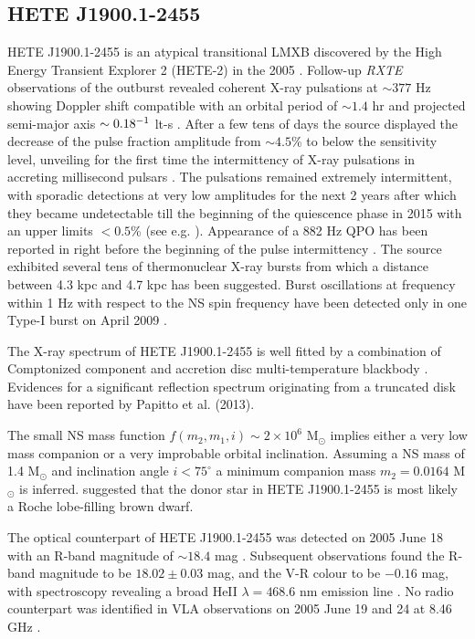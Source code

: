 \documentclass[graybox]{svmult}
\def \rxte {{\em RXTE\xspace}}
\begin{document}
\subsection{HETE J1900.1-2455}

HETE J1900.1-2455 is an atypical transitional LMXB discovered by the High Energy Transient Explorer 2 (HETE-2) in the 2005 \cite{Vanderspek2005}. Follow-up \rxte{} observations of the outburst revealed coherent X-ray pulsations at $\sim377$ Hz showing Doppler shift compatible with an orbital period of $\sim1.4$ hr and projected semi-major axis $\sim0.18\time10^{-1}$ lt-s \cite{Kaaret2006}. After a few tens of days the source displayed the decrease of the pulse fraction amplitude from $\sim4.5$\% to below the sensitivity level, unveiling for the first time the intermittency of X-ray pulsations in accreting millisecond pulsars \cite{Galloway2005b}. The pulsations remained extremely intermittent, with sporadic detections at very low amplitudes for the next 2 years \cite{Patruno2012a} after which they became undetectable till the beginning of the quiescence phase in 2015 \cite{Degenaar2017} with an upper limits $<0.5$\% (see e.g. \cite{Galloway2008,Patruno2012a,Papitto2013a}). Appearance of a 882 Hz QPO has been reported in right before the beginning of the pulse intermittency \cite{Kaaret2006}.
The source exhibited several tens of thermonuclear X-ray bursts from which a distance between 4.3 kpc \cite{Suzuki2007} and 4.7 kpc \cite{Galloway2008} has been suggested. Burst oscillations at frequency within 1 Hz with respect to the NS spin frequency have been detected only in one Type-I burst on April 2009 \cite{Watts2009}. 

The X-ray spectrum of HETE J1900.1-2455 is well fitted by a combination of Comptonized component and accretion disc multi-temperature blackbody \cite{Falanga2007,Papitto2013a}. Evidences for a significant reflection spectrum originating from a truncated disk have been reported by Papitto et al. (2013).


The small NS mass function $f(m_2,m_1,i)\sim 2\times 10^6$ M$_\odot$ implies either a very low mass companion or a very improbable orbital inclination. Assuming a NS mass of 1.4 M$_\odot$ and inclination angle $i<75^\circ$ a minimum companion mass $m_2=0.0164$ M$_\odot$ is inferred. \cite{Kaaret2006} suggested that the donor star in HETE J1900.1-2455 is most likely a Roche lobe-filling brown dwarf. 

The optical counterpart of HETE J1900.1-2455 was detected on 2005 June 18 with an R-band magnitude of $\sim18.4$ mag \cite{Fox2005}. Subsequent observations found the R-band magnitude to be $18.02\pm0.03$ mag, and the V-R colour to be $-0.16$ mag, with spectroscopy revealing a broad HeII $\lambda=468.6$ nm  emission line \cite{Elebert2008}. No radio counterpart was identified in VLA observations on 2005 June 19 and 24 at 8.46 GHz \cite{Rupen2005}.
\end{document}
